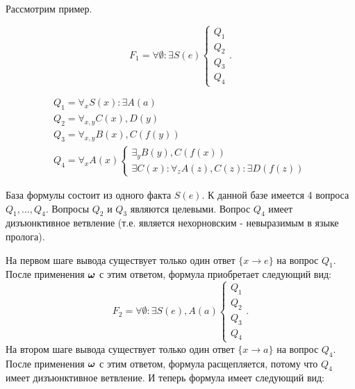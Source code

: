 %


Рассмотрим пример.

\begin{example}\label{proofexample}


\begin{equation*}\label{ex:f1}
	F_1 = \forall \emptyset\colon \exists S(e)
	\left\lbrace
	\begin{array}{l}
		Q_1 \\
		Q_2 \\
		Q_3 \\
		Q_4
	\end{array}\right..
\end{equation*}

\begin{equation*}
	\begin{array}{l}
	Q_1 = \forall_x S(x)\colon \exists A(a) \\
	Q_2 = \forall_{x,y} C(x),D(y) \\
	Q_3 = \forall_{x,y} B(x),C(f(y)) \\
	Q_4 =
	\forall_x A(x)
	\left\lbrace
	\begin{array}{l}
		\exists_y B(y),C(f(x)) \\
		\exists C(x): \forall_z A(z),C(z)\colon \exists D(f(z))
	\end{array}\right.
	\end{array}
\end{equation*}

База формулы состоит из одного факта $S(e)$. К данной базе имеется 4 вопроса $Q_1,\ldots,Q_4$. Вопросы $Q_2$ и $Q_3$ являются целевыми. Вопрос $Q_4$ имеет дизъюнктивное ветвление (т.е. является нехорновским - невыразимым в языке пролога).

На первом шаге вывода существует только один ответ $\{x \rightarrow e\}$ на вопрос $Q_1$. После применения $\boldsymbol{\omega}$ с этим ответом, формула приобретает следующий вид:
\begin{equation*}\label{ex:f2}
	F_2 = \forall \emptyset\colon \exists S(e),A(a)
	\left\lbrace
	\begin{array}{l}
		Q_1 \\
		Q_2 \\
		Q_3 \\
		Q_4
	\end{array}\right..
\end{equation*}
На втором шаге вывода существует только один ответ $\{x \rightarrow a\}$ на вопрос $Q_4$. После применения $\boldsymbol{\omega}$ с этим ответом, формула расщепляется, потому что $Q_4$ имеет дизъюнктивное ветвление. И теперь формула имеет следующий вид:


\end{example}
